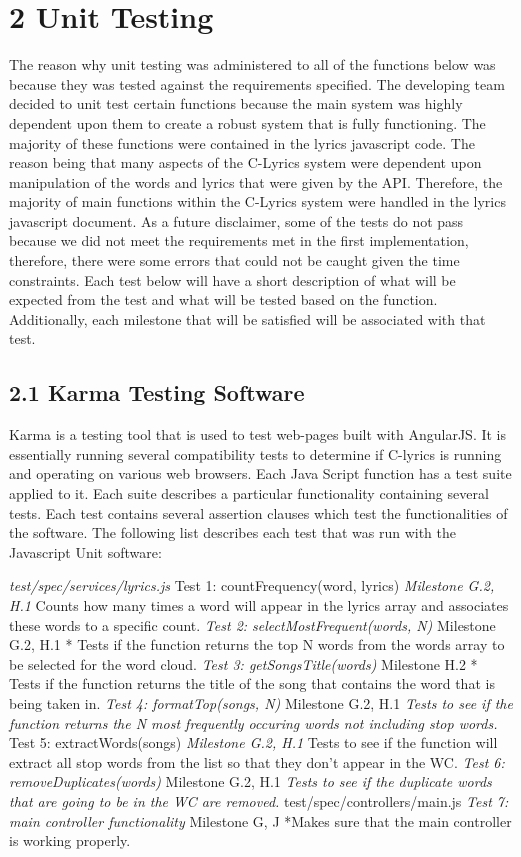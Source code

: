 \documentclass[]{article}
\begin{document}
\section{\textbf{2 Unit Testing}}\label{unit-testing}

The reason why unit testing was administered to all of the functions
below was because they was tested against the requirements specified.
The developing team decided to unit test certain functions because the
main system was highly dependent upon them to create a robust system
that is fully functioning. The majority of these functions were
contained in the lyrics javascript code. The reason being that many
aspects of the C-Lyrics system were dependent upon manipulation of the
words and lyrics that were given by the API. Therefore, the majority of
main functions within the C-Lyrics system were handled in the lyrics
javascript document. As a future disclaimer, some of the tests do not
pass because we did not meet the requirements met in the first
implementation, therefore, there were some errors that could not be
caught given the time constraints. Each test below will have a short
description of what will be expected from the test and what will be
tested based on the function. Additionally, each milestone that will be
satisfied will be associated with that test.

\subsection{\textbf{2.1 Karma Testing
Software}}\label{karma-testing-software}

Karma is a testing tool that is used to test web-pages built with
AngularJS. It is essentially running several compatibility tests to
determine if C-lyrics is running and operating on various web browsers.
Each Java Script function has a test suite applied to it. Each suite
describes a particular functionality containing several tests. Each test
contains several assertion clauses which test the functionalities of the
software. The following list describes each test that was run with the
Javascript Unit software:

\emph{test/spec/services/lyrics.js }Test 1: countFrequency(word, lyrics)
\emph{Milestone G.2, H.1 }Counts how many times a word will appear in
the lyrics array and associates these words to a specific count.
\emph{Test 2: selectMostFrequent(words, N) }Milestone G.2, H.1 * Tests
if the function returns the top N words from the words array to be
selected for the word cloud. \emph{Test 3: getSongsTitle(words)
}Milestone H.2 * Tests if the function returns the title of the song
that contains the word that is being taken in. \emph{Test 4:
formatTop(songs, N) }Milestone G.2, H.1 \emph{Tests to see if the
function returns the N most frequently occuring words not including stop
words. }Test 5: extractWords(songs) \emph{Milestone G.2, H.1 }Tests to
see if the function will extract all stop words from the list so that
they don't appear in the WC. \emph{Test 6: removeDuplicates(words)
}Milestone G.2, H.1 \emph{Tests to see if the duplicate words that are
going to be in the WC are removed. }test/spec/controllers/main.js
\emph{Test 7: main controller functionality }Milestone G, J *Makes sure
that the main controller is working properly.
\end{document}
